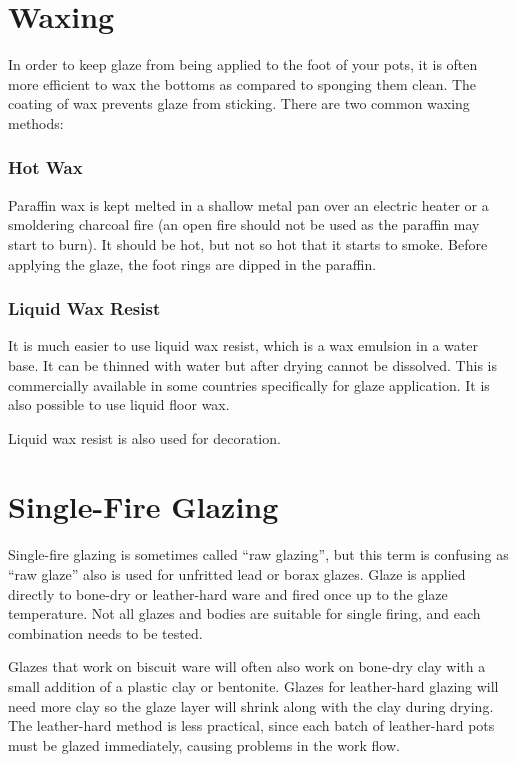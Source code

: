 \section{Waxing}
In order to keep glaze from being applied to the foot of your pots, it is often 
more efficient to wax the bottoms as compared to sponging them clean. The 
coating of wax prevents glaze from sticking. There are two common waxing 
methods:
\subsubsection{Hot Wax}
Paraffin wax is kept melted in a shallow metal pan over an electric heater or 
a smoldering charcoal fire (an open fire should not be used as the paraffin 
may start to burn). It should be hot, but not so hot that it starts to smoke. 
Before applying the glaze, the foot rings are dipped in the paraffin.
\subsubsection{Liquid Wax Resist}
It is much easier to use liquid wax resist, which is a wax emulsion in a 
water base. It can be thinned with water but after drying cannot be 
dissolved. This is commercially available in some countries specifically for 
glaze application. It is also possible to use liquid floor wax.

Liquid wax resist is also used for decoration.
\section{Single-Fire Glazing}
Single-fire glazing is sometimes called ``raw glazing'', but this term is 
confusing as ``raw glaze'' also is used for unfritted lead or borax glazes. 
Glaze is applied directly to bone-dry or leather-hard ware and fired once up to 
the glaze temperature. Not all glazes and bodies are suitable for single 
firing, and each combination needs to be tested.

Glazes that work on biscuit ware will often also work on bone-dry clay with a 
small addition of a plastic clay or bentonite. Glazes for leather-hard glazing 
will need more clay so the glaze layer will shrink along with the clay during 
drying. The leather-hard method is less practical, since each batch of 
leather-hard pots must be glazed immediately, causing problems in the work flow.

